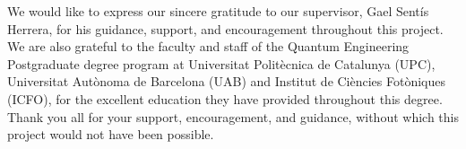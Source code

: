 We would like to express our sincere gratitude to our supervisor, Gael Sent\'is Herrera, for his guidance, support, and encouragement throughout this project. We are also grateful to the faculty and staff of the Quantum Engineering Postgraduate degree program at Universitat Polit\`ecnica de Catalunya (UPC), Universitat Aut\`onoma de Barcelona (UAB) and Institut de Ci\`encies Fot\`oniques (ICFO), for the excellent education they have provided throughout this degree. Thank you all for your support, encouragement, and guidance, without which this project would not have been possible.